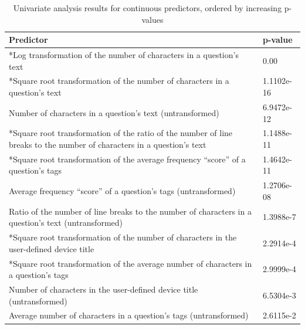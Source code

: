 \documentclass{article}
\begin{document}
\begin{table}[!htbp]
\centering
\caption{Univariate analysis results for continuous predictors, ordered by increasing p-values} 
\begin{tabular}{|p{12cm}|p{2cm}|}
  \hline
  Predictor & p-value \\ 
  \hline \hline
  *Log transformation of the number of characters in a question's text & 0.00 \\ \hline
  *Square root transformation of the number of characters in a question's text & 1.1102e-16 \\ \hline
  Number of characters in a question's text (untransformed) & 6.9472e-12 \\\hline
  *Square root transformation of the ratio of the number of line breaks to the number of characters in a question's text & 1.1488e-11 \\ \hline
  *Square root transformation of the average frequency ``score'' of a question's tags & 1.4642e-11 \\ \hline
  Average frequency ``score'' of a question's tags (untransformed) & 1.2706e-08 \\ \hline
  Ratio of the number of line breaks to the number of characters in a question's text (untransformed) & 1.3988e-7 \\ \hline
  *Square root transformation of the number of characters in the user-defined device title & 2.2914e-4 \\ \hline
  *Square root transformation of the average number of characters in a question's tags & 2.9999e-4 \\ \hline
  Number of characters in the user-defined device title (untransformed) & 6.5304e-3 \\ \hline
  Average number of characters in a question's tags (untransformed) & 2.6115e-2 \\ \hline
\end{tabular}
\label{table:qresults}
\end{table}
\end{document}
